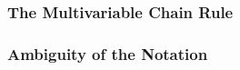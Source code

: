 \subsubsection{The Multivariable Chain Rule}

\subsubsection{Ambiguity of the Notation}
















